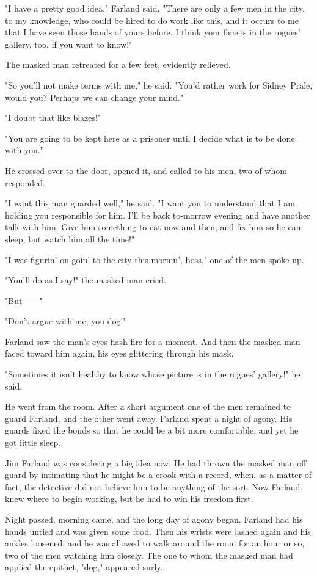 \documentclass{novel}
\begin{document}
"I have a pretty good idea," Farland said. "There are only a few men in the city, to my knowledge, who could be hired to do work like this, and it occurs to me that I have seen those hands of yours before. I think your face is in the rogues' gallery, too, if you want to know!"

The masked man retreated for a few feet, evidently relieved.

"So you'll not make terms with me," he said. "You'd rather work for Sidney Prale, would you? Perhaps we can change your mind."

"I doubt that like blazes!"

"You are going to be kept here as a prisoner until I decide what is to be done with you."

He crossed over to the door, opened it, and called to his men, two of whom responded.

"I want this man guarded well," he said. "I want you to understand that I am holding you responsible for him. I'll be back to-morrow evening and have another talk with him. Give him something to eat now and then, and fix him so he can sleep, but watch him all the time!"

"I was figurin' on goin' to the city this mornin', boss," one of the men spoke up.

"You'll do as I say!" the masked man cried.

"But------"

"Don't argue with me, you dog!"

Farland saw the man's eyes flash fire for a moment. And then the masked man faced toward him again, his eyes glittering through his mask.

"Sometimes it isn't healthy to know whose picture is in the rogues' gallery!" he said.

He went from the room. After a short argument one of the men remained to guard Farland, and the other went away. Farland spent a night of agony. His guards fixed the bonds so that he could be a bit more comfortable, and yet he got little sleep.

Jim Farland was considering a big idea now. He had thrown the masked man off guard by intimating that he might be a crook with a record, when, as a matter of fact, the detective did not believe him to be anything of the sort. Now Farland knew where to begin working, but he had to win his freedom first.

Night passed, morning came, and the long day of agony began. Farland had his hands untied and was given some food. Then his wrists were lashed again and his ankles loosened, and he was allowed to walk around the room for an hour or so, two of the men watching him closely. The one to whom the masked man had applied the epithet, "dog," appeared surly.
\end{document}
